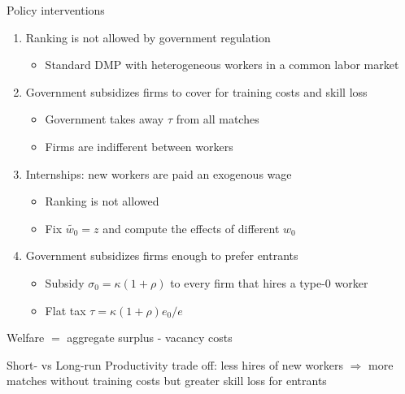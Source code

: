 \documentclass[9pt,xcolor={svgnames}]{beamer}
\begin{document}
\begin{frame}{Policy interventions}
\begin{enumerate}
\setlength\itemsep{1.6em}
    \item Ranking is not allowed by government regulation
    \smallskip
    \begin{itemize}
        \item Standard DMP with heterogeneous workers in a common labor market 
    \end{itemize}
    \item Government subsidizes firms to cover for training costs and skill loss
    \smallskip
    \begin{itemize}
        \item Government takes away $\tau$ from all matches
        \item Firms are indifferent between workers
    \end{itemize}
        \item Internships: new workers are paid an exogenous wage
        \smallskip
    \begin{itemize}
        \item Ranking is not allowed 
        \item Fix $\tilde{w_{0}} = z$ and compute the effects of different $w_{0}$
    \end{itemize}
    \item Government subsidizes firms enough to prefer entrants
    \smallskip
    \begin{itemize}
        \item Subsidy $\sigma_0=\kappa(1+\rho)$ to every firm that hires a type-0 worker 
        \item Flat tax $\tau = \kappa(1+\rho)e_0/e$
    \end{itemize}
\end{enumerate}
\vspace{0.25cm}
Welfare $=$ aggregate surplus - vacancy costs 

\vspace{0.1cm}
Short- vs Long-run Productivity trade off: less hires of new workers $\Rightarrow$ more matches without training costs but greater skill loss for entrants
\end{frame}
\end{document}
